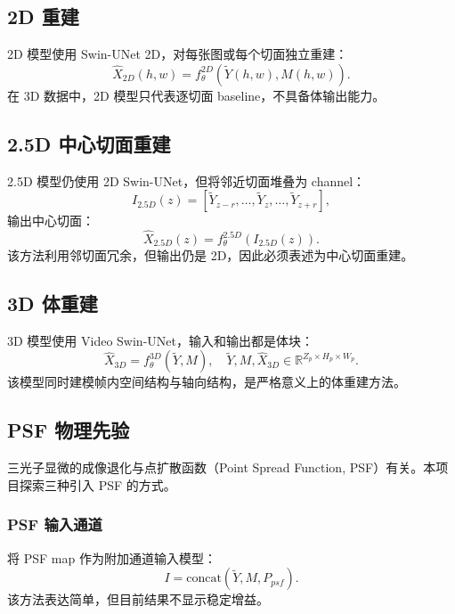 \documentclass[UTF8, scheme=plain, 11pt, a4paper]{ctexart}
\newcommand{\R}{\mathbb{R}}
\begin{document}
\subsection{2D 重建}

2D 模型使用 Swin-UNet 2D，对每张图或每个切面独立重建：
\begin{equation}
  \hat{X}_{2D}(h,w) = f^{2D}_\theta(\widetilde{Y}(h,w), M(h,w)).
\end{equation}
在 3D 数据中，2D 模型只代表逐切面 baseline，不具备体输出能力。

\subsection{2.5D 中心切面重建}

2.5D 模型仍使用 2D Swin-UNet，但将邻近切面堆叠为 channel：
\begin{equation}
  I_{2.5D}(z) = [\widetilde{Y}_{z-r}, \ldots, \widetilde{Y}_z, \ldots, \widetilde{Y}_{z+r}],
\end{equation}
输出中心切面：
\begin{equation}
  \hat{X}_{2.5D}(z) = f^{2.5D}_\theta(I_{2.5D}(z)).
\end{equation}
该方法利用邻切面冗余，但输出仍是 2D，因此必须表述为中心切面重建。

\subsection{3D 体重建}

3D 模型使用 Video Swin-UNet，输入和输出都是体块：
\begin{equation}
  \hat{X}_{3D} = f^{3D}_\theta(\widetilde{Y}, M), \quad \widetilde{Y}, M, \hat{X}_{3D} \in \R^{Z_p \times H_p \times W_p}.
\end{equation}
该模型同时建模帧内空间结构与轴向结构，是严格意义上的体重建方法。

\subsection{PSF 物理先验}

三光子显微的成像退化与点扩散函数（Point Spread Function, PSF）有关。本项目探索三种引入 PSF 的方式。

\subsubsection{PSF 输入通道}

将 PSF map 作为附加通道输入模型：
\begin{equation}
  I = \mathrm{concat}(\widetilde{Y}, M, P_{psf}).
\end{equation}
该方法表达简单，但目前结果不显示稳定增益。
\end{document}
